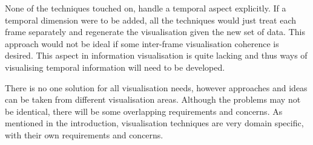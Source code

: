 None of the techniques touched on, handle a temporal aspect explicitly. If a
temporal dimension were to be added, all the techniques would just treat each
frame separately and regenerate the visualisation given the new set of data.
This approach would not be ideal if some inter-frame visualisation coherence is
desired. This aspect in information visualisation is quite lacking and thus ways
of visualising temporal information will need to be developed.

There is no one solution for all visualisation needs, however approaches and
ideas can be taken from different visualisation areas. Although the problems
may not be identical, there will be some overlapping requirements and concerns.
As mentioned in the introduction, visualisation techniques are very domain
specific, with their own requirements and concerns.


